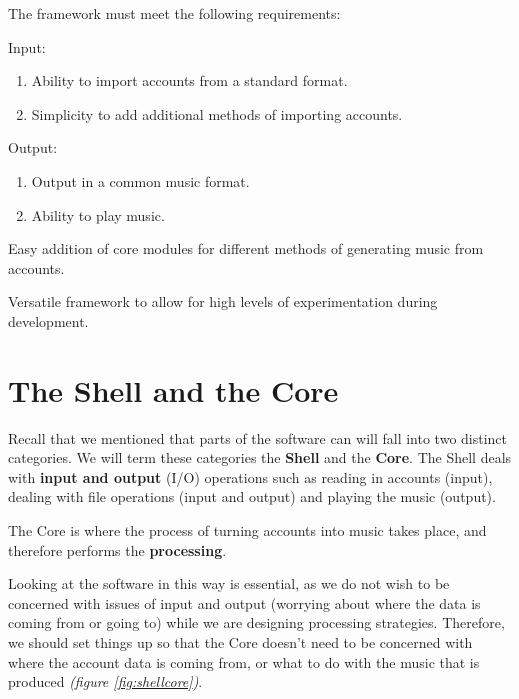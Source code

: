 The framework must meet the following requirements:
\begin{enumerate}
\begin{singlespace}
\item Input:
\begin{enumerate}
\item Ability to import accounts from a standard format.
\item Simplicity to add additional methods of importing accounts.
\end{enumerate}
\item Output:
\begin{enumerate}
\item Output in a common music format.
\item Ability to play music.
\end{enumerate}
\item Easy addition of core modules for different methods of generating music from accounts.
\item Versatile framework to allow for high levels of experimentation during development.
\end{singlespace}
\end{enumerate}

\section{The Shell and the Core}

Recall that we mentioned that parts of the software can will fall into two distinct categories. We will term these categories the \textbf{Shell} and the \textbf{Core}. The Shell deals with \textbf{input and output} (I/O) operations such as reading in accounts (input), dealing with file operations (input and output) and playing the music (output).

The Core is where the process of turning accounts into music takes place, and therefore performs the \textbf{processing}.

Looking at the software in this way is essential, as we do not wish to be concerned with issues of input and output (worrying about where the data is coming from or going to) while we are designing processing strategies. Therefore, we should set things up so that the Core doesn't need to be concerned with where the account data is coming from, or what to do with the music that is produced \textit{(figure \ref{fig:shellcore})}.

